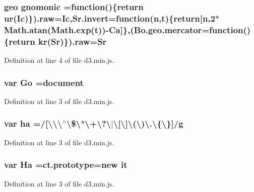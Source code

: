 \subsubsection[{gnomonic}]{ {\bf geo} gnomonic =function()\{{\bf return} {\bf ur}({\bf Ic})\}).raw={\bf Ic},Sr.\+invert=function({\bf n},t)\{{\bf return}[{\bf n},2$\ast$Math.\+atan(Math.\+exp(t))-\/{\bf Ca}]\},(Bo.\+geo.\+mercator=function()\{{\bf return} {\bf kr}({\bf Sr})\}).raw={\bf Sr}}\label{d3_8min_8js_a93273a4df542e08330d29894fbd494d7}


Definition at line 4 of file d3.\+min.\+js.

\subsubsection[{Go}]{\setlength{\rightskip}{0pt plus 5cm}var Go ={\bf document}}\label{d3_8min_8js_a1457c3cf0f89791e180cc77490538b58}


Definition at line 3 of file d3.\+min.\+js.

\subsubsection[{ha}]{\setlength{\rightskip}{0pt plus 5cm}var ha =/[\textbackslash{}\textbackslash{}\textbackslash{}$^\wedge$\textbackslash{}\$\textbackslash{}$\ast$\textbackslash{}+\textbackslash{}?\textbackslash{}$\vert$\textbackslash{}[\textbackslash{}]\textbackslash{}(\textbackslash{})\textbackslash{}.\textbackslash{}\{\textbackslash{}\}]/g}\label{d3_8min_8js_ae7fcf29f2527ffb89d5d68392084338e}


Definition at line 3 of file d3.\+min.\+js.

\subsubsection[{Ha}]{\setlength{\rightskip}{0pt plus 5cm}var Ha ={\bf ct.\+prototype}=new it}\label{d3_8min_8js_a64653b861339bb938d2b0ff76d0065e5}


Definition at line 3 of file d3.\+min.\+js.

